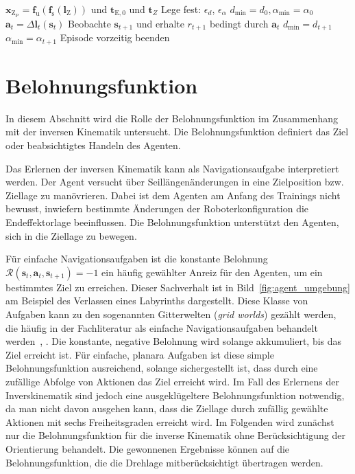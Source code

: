 \begin{algorithm}[H]
\begin{algorithmic}[1]
$\bm{x}_\mathrm{Z_{P}} = \bm{f}_\mathrm{u} \left( \bm{f}_\mathrm{s} \left( \bm{l}_\mathrm{Z} \right) \right)$ 
und $\bm{t}_{\mathrm{E},0}$ und $\bm{t}_{Z}$
\State Lege fest: $\epsilon_d$, $\epsilon_\alpha$
\State $d_{\mathrm{min}} = d_0, \alpha_{\mathrm{min}} = \alpha_0$
	\State $\bm{a}_t = \Delta \bm{l}_t (\bm{s}_t)$
	\State Beobachte $\bm{s}_{t+1}$ und erhalte $r_{t+1}$ bedingt durch $\bm{a}_t$
		\State $d_{\mathrm{min}} = d_{t+1}$
		\State $\alpha_{\mathrm{min}} = \alpha_{t+1}$
	\EndIf
		 \State Episode vorzeitig beenden
	\EndIf
\EndFor
\end{algorithmic}
\end{algorithm}








\pagebreak
\section{Belohnungsfunktion}
\label{sec:belohnungsfunktion}

In diesem Abschnitt wird die Rolle der Belohnungsfunktion im Zusammenhang mit der inversen Kinematik untersucht. Die Belohnungsfunktion definiert das Ziel oder beabsichtigtes Handeln des Agenten. \newline

Das Erlernen der inversen Kinematik kann als Navigationsaufgabe interpretiert werden. Der Agent versucht über Seillängenänderungen in eine Zielposition bzw. Ziellage zu manövrieren. Dabei ist dem Agenten am Anfang des Trainings nicht bewusst, inwiefern bestimmte Änderungen der Roboterkonfiguration die Endeffektorlage beeinflussen. Die Belohnungsfunktion unterstützt den Agenten, sich in die Ziellage zu bewegen. 

Für einfache Navigationsaufgaben ist die konstante Belohnung
$\mathcal{R}(\bm{s}_t, \bm{a}_t, \bm{s}_{t+1})=-1$
ein häufig gewählter Anreiz für den Agenten, um ein bestimmtes Ziel zu erreichen. Dieser Sachverhalt ist in Bild~\ref{fig:agent_umgebung} am Beispiel des Verlassen eines Labyrinths dargestellt. Diese Klasse von Aufgaben kann zu den sogenannten Gitterwelten (\textit{grid worlds}) gezählt werden, die häufig in der Fachliteratur als einfache Navigationsaufgaben behandelt werden~\cite{SB98}, \cite{NHR99}. Die konstante, negative Belohnung wird solange akkumuliert, bis das Ziel erreicht ist. Für einfache, planara Aufgaben ist diese simple Belohnungsfunktion ausreichend, solange sichergestellt ist, dass durch eine zufällige Abfolge von Aktionen das Ziel erreicht wird. Im Fall des Erlernens der Inverskinematik sind jedoch eine ausgeklügeltere Belohnungsfunktion notwendig, da man nicht davon ausgehen kann, dass die Ziellage durch zufällig gewählte Aktionen mit sechs Freiheitsgraden erreicht wird. Im Folgenden wird zunächst nur die Belohnungsfunktion für die inverse Kinematik ohne Berücksichtigung der Orientierung behandelt. Die gewonnenen Ergebnisse können auf die Belohnungsfunktion, die die Drehlage mitberücksichtigt übertragen werden. 

